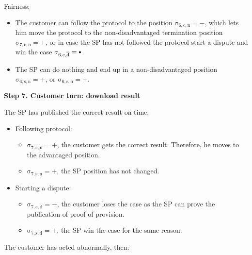 \documentclass{ieeeaccess}
\newcommand\sbullet[1][.75]{\mathbin{\ThisStyle{\vcenter{\hbox{%
  \scalebox{#1}{$\SavedStyle\bullet$}}}}}%
}
\begin{document}
Fairness:

\begin{itemize}

\item
  The customer can follow the protocol to the position \(\operatorname{\sigma_{6, c, n} = -}\), which lets him move the protocol to the non-disadvantaged termination position \(\operatorname{\sigma_{7, c, n} = +}\), or in case the SP has not followed the protocol start a dispute and win the case \(\operatorname{\sigma_{6, c, \overline{d}} = \sbullet}\).
\item
  The SP can do nothing and end up in a non-disadvantaged position \(\operatorname{\sigma_{6, s, n} = +}\), or \(\operatorname{\sigma_{6, s, \overline{n}} = +}\).
\end{itemize}

\noindent \textbf
{Step 7. Customer turn: download result}\label{step-7-retrieval-of-results}

The SP has published the correct result on time:

\begin{itemize}
\item
  Following protocol:

  \begin{itemize}
  
  \item
    \(\operatorname{\sigma_{7, c, n} = +}\), the customer gets the correct result. Therefore, he moves to the advantaged position. 
  \item
    \(\operatorname{\sigma_{7, s, n} = +}\), the SP position has not changed. 
  \end{itemize}
\item
  Starting a dispute:

  \begin{itemize}
  
  \item
    \(\operatorname{\sigma_{7, c, d} = -}\), the customer loses the case as the SP can prove the publication of proof of provision. 
  \item
    \(\operatorname{\sigma_{7, s, d} = +}\), the SP win the case for the same reason.
  \end{itemize}
\end{itemize}

The customer has acted abnormally, then:
\end{document}
